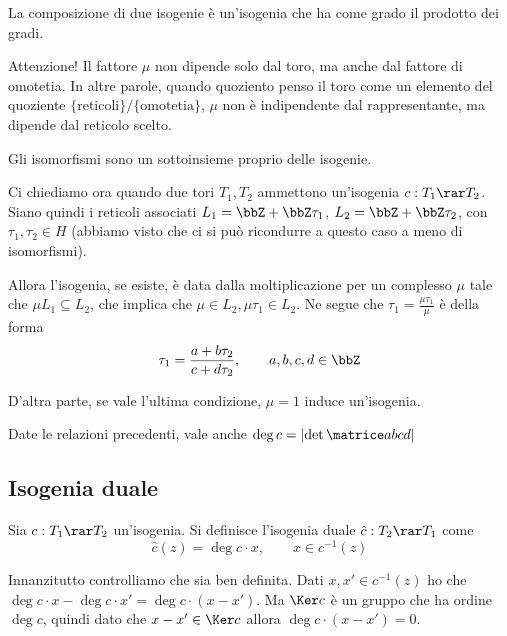 	\begin{osservazione}
		La composizione di due isogenie è un'isogenia che ha come grado il prodotto dei gradi.
	\end{osservazione}

	Attenzione! Il fattore $\mu$ non dipende solo dal toro, ma anche dal fattore di omotetia. In altre parole, quando quoziento penso il toro come un elemento del quoziente $\{ \mbox{reticoli} \} / \{ \mbox{omotetia} \}$, $\mu$ non è indipendente dal rappresentante, ma dipende dal reticolo scelto.

	\begin{osservazione}
		Gli isomorfismi sono un sottoinsieme proprio delle isogenie.
	\end{osservazione}

	Ci chiediamo ora quando due tori $T_1, T_2$ ammettono un'isogenia $c: T_1 \rar T_2$. Siano quindi i reticoli associati $L_1=\bbZ + \bbZ \tau_1$, $L_2=\bbZ + \bbZ \tau_2$, con $\tau_1,\tau_2 \in H$ (abbiamo visto che ci si può ricondurre a questo caso a meno di isomorfismi).

	Allora l'isogenia, se esiste, è data dalla moltiplicazione per un complesso $\mu$ tale che $\mu L_1 \subseteq L_2$, che implica che $\mu \in L_2, \mu\tau_1 \in L_2$. Ne segue che $\tau_1 = \frac{\mu\tau_1}{\mu}$ è della forma
	\[
		\tau_1 = \frac{a + b\tau_2}{c+d\tau_2}, \qquad a,b,c,d \in \bbZ
	\]

	D'altra parte, se vale l'ultima condizione, $\mu=1$ induce un'isogenia.

    \begin{osservazione}
        Date le relazioni precedenti, vale anche $\deg c = \left| \det \matrice abcd \right|$
    \end{osservazione}

	\subsection{Isogenia duale}

	Sia $c: T_1 \rar T_2$ un'isogenia. Si definisce l'isogenia duale $\hat c: T_2 \rar T_1$ come
	\[
		\hat c(z) = \deg c\cdot x, \qquad x \in c^{-1}(z)
	\]

	Innanzitutto controlliamo che sia ben definita. Dati $x, x' \in c^{-1}(z)$ ho che $\deg c \cdot x - \deg c \cdot x' = \deg c \cdot (x-x')$. Ma $\Ker c$ è un gruppo che ha ordine $\deg c$, quindi dato che $x-x' \in \Ker c$ allora $\deg c \cdot (x-x') = 0$.

